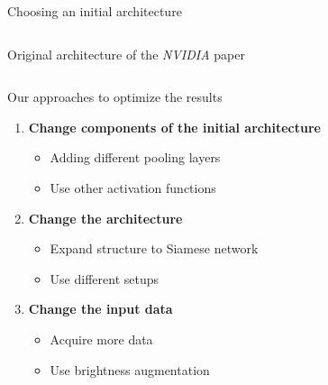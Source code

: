 \begin{frame}{Choosing an initial architecture}
\begin{columns}[c]
\begin{column}{0.4\textwidth}
			{\footnotesize Original architecture of the \textit{NVIDIA} paper \cite{NVIDIA2016}}
		\end{column}
	\end{columns}
\end{frame}

\begin{frame}{Our approaches to optimize the results}
	\begin{enumerate}
		\item \textbf{Change components of the initial architecture}
		\begin{itemize}
			\item Adding different pooling layers
			\item Use other activation functions
		\end{itemize}
		\item \textbf{Change the architecture}
		\begin{itemize}
			\item Expand structure to Siamese network
			\item Use different setups
		\end{itemize}
		\item \textbf{Change the input data}
		\begin{itemize}
			\item Acquire more data
			\item Use brightness augmentation
		\end{itemize}
	\end{enumerate}
\end{frame}